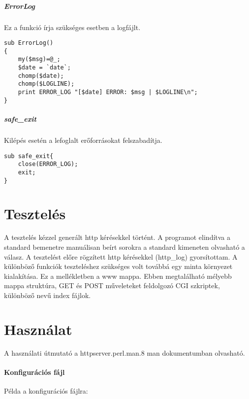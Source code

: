 \documentclass[12pt,a4paper]{article}
\begin{document}
\subparagraph{ErrorLog} Ez a funkció írja szükséges esetben a logfájlt.
\begin{lstlisting}
sub ErrorLog()
{
    my($msg)=@_;
    $date = `date`;
    chomp($date);
    chomp($LOGLINE);
    print ERROR_LOG "[$date] ERROR: $msg | $LOGLINE\n";
}
\end{lstlisting}

\subparagraph{safe\_exit} Kilépés esetén a lefoglalt erőforrásokat felszabadítja.
\begin{lstlisting}
sub safe_exit{
    close(ERROR_LOG);
    exit;
}
\end{lstlisting}

\section{Tesztelés}
A tesztelés kézzel generált http kérésekkel történt. A programot elindítva a standard bemenetre manuálisan beírt sorokra a standard kimeneten olvasható a válasz. A tesztelést előre rögzített http kérésekkel (http\_log) gyorsítottam. A különböző funkciók teszteléshez szükséges volt továbbá egy minta környezet kialakítása. Ez a mellékletben a www mappa. Ebben megtalálható mélyebb mappa struktúra, GET és POST műveleteket feldolgozó CGI szkriptek, különböző nevű index fájlok. 
\section{Használat}
A használati útmutató a httpserver.perl.man.8 man dokumentumban olvasható.
\paragraph{Konfigurációs fájl}
Példa a konfigurációs fájlra:


\newpage
\end{document}
